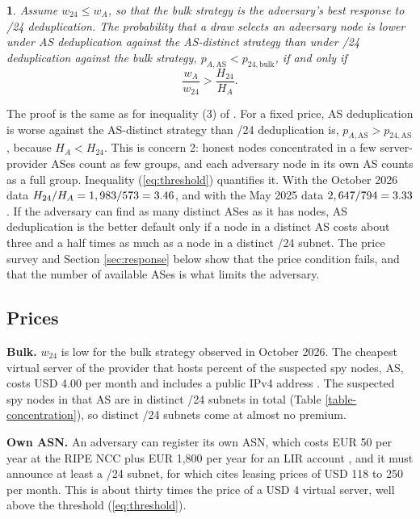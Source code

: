 \documentclass[english]{mrl}
\theoremstyle{plain}
\newtheorem{prop}{\protect\propositionname}
\providecommand{\propositionname}{Proposition}
\begin{document}
\begin{prop}
Assume $w_{24} \le w_{A}$, so that the bulk strategy is the adversary's best response to /24 deduplication. The probability that a draw selects an adversary node is lower under AS deduplication against the AS-distinct strategy than under /24 deduplication against the bulk strategy, $p_{A,\mathrm{AS}} < p_{24,\mathrm{bulk}}$, if and only if
\begin{equation}
\frac{w_{A}}{w_{24}} > \frac{H_{24}}{H_{A}}.\label{eq:threshold}
\end{equation}
\end{prop}
The proof is the same as for inequality (3) of \cite{Rucknium2025}. For a fixed price, AS deduplication is worse against the AS-distinct strategy than /24 deduplication is, $p_{A,\mathrm{AS}} > p_{24,\mathrm{AS}}$, because $H_{A} < H_{24}$. This is concern 2: honest nodes concentrated in a few server-provider ASes count as few groups, and each adversary node in its own AS counts as a full group. Inequality (\ref{eq:threshold}) quantifies it. With the October 2026 data $H_{24}/H_{A} = 1,983/573 = 3.46$, and with the May 2025 data $2,647/794 = 3.33$. If the adversary can find as many distinct ASes as it has nodes, AS deduplication is the better default only if a node in a distinct AS costs about three and a half times as much as a node in a distinct /24 subnet. The price survey and Section \ref{sec:response} below show that the price condition fails, and that the number of available ASes is what limits the adversary.

\subsection{Prices}

\textbf{Bulk.} $w_{24}$ is low for the bulk strategy observed in October 2026. The cheapest virtual server of the provider that hosts \spyTopAsnPctNew{} percent of the suspected spy nodes, AS\spyTopAsnNew{}, costs USD 4.00 per month and includes a public IPv4 address \cite{DOPricing}. The \spyTopAsnNNew{} suspected spy nodes in that AS are in \spyTwentyFourNew{} distinct /24 subnets in total (Table \ref{table-concentration}), so distinct /24 subnets come at almost no premium.

\textbf{Own ASN.} An adversary can register its own ASN, which costs EUR 50 per year at the RIPE NCC plus EUR 1,800 per year for an LIR account \cite{RIPE848}, and it must announce at least a /24 subnet, for which \cite{Rucknium2025} cites leasing prices of USD 118 to 250 per month. This is about thirty times the price of a USD 4 virtual server, well above the threshold (\ref{eq:threshold}).
\end{document}
